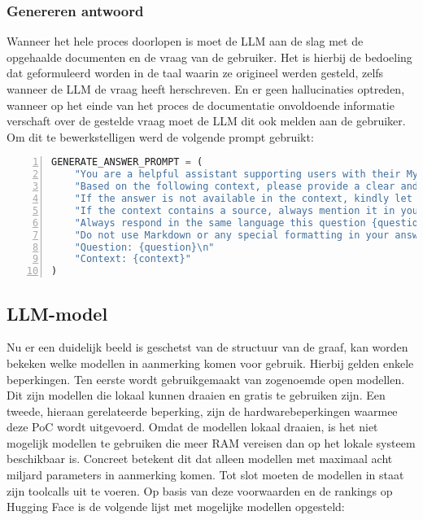 \subsubsection{Genereren antwoord}

Wanneer het hele proces doorlopen is moet de LLM aan de slag met de opgehaalde documenten en de vraag van de gebruiker. Het is hierbij de bedoeling dat geformuleerd worden in de taal waarin ze origineel werden gesteld, zelfs wanneer de LLM de vraag heeft herschreven. En er geen hallucinaties optreden, wanneer op het einde van het proces de documentatie onvoldoende informatie verschaft over de gestelde vraag moet de LLM dit ook melden aan de gebruiker. Om dit te bewerkstelligen werd de volgende prompt gebruikt: 

\begin{lstlisting}[basicstyle=\small, frame=single, breaklines=true, postbreak=\mbox{\textcolor{red}{$\hookrightarrow$}\space}, escapeinside ={\%,}, escapechar={!}, numbers=left, language=Python, caption=Prompt voor genereren van antwoord op basis van de opgehaalde context]
GENERATE_ANSWER_PROMPT = (
    "You are a helpful assistant supporting users with their MyMinfin IT-related questions.\n"
    "Based on the following context, please provide a clear and complete answer.\n"
    "If the answer is not available in the context, kindly let the user know that you don't have enough information.\n"
    "If the context contains a source, always mention it in your answer as the reference.\n"
    "Always respond in the same language this question {question} is asked, even if the context is in a different language.\n"
    "Do not use Markdown or any special formatting in your answer, respond in plain text only.\n\n"
    "Question: {question}\n"
    "Context: {context}"
)
\end{lstlisting}

\subsection{LLM-model}

Nu er een duidelijk beeld is geschetst van de structuur van de graaf, kan worden bekeken welke modellen in aanmerking komen voor gebruik. Hierbij gelden enkele beperkingen. Ten eerste wordt gebruikgemaakt van zogenoemde open modellen. Dit zijn modellen die lokaal kunnen draaien en gratis te gebruiken zijn. Een tweede, hieraan gerelateerde beperking, zijn de hardwarebeperkingen waarmee deze PoC wordt uitgevoerd. Omdat de modellen lokaal draaien, is het niet mogelijk modellen te gebruiken die meer RAM vereisen dan op het lokale systeem beschikbaar is. Concreet betekent dit dat alleen modellen met maximaal acht miljard parameters in aanmerking komen. Tot slot moeten de modellen in staat zijn toolcalls uit te voeren. Op basis van deze voorwaarden en de rankings op Hugging Face is de volgende lijst met mogelijke modellen opgesteld:

